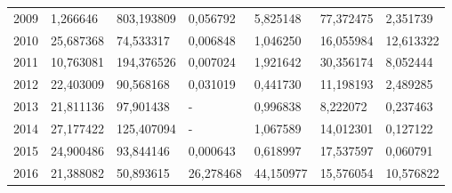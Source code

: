\begin{table}
\begin{tabular}{p{1cm}p{2cm}p{2cm}p{2cm}p{2cm}p{2cm}p{2cm}}
 2009 &                               1,266646 & 803,193809 &     0,056792 &                                           5,825148 &                           77,372475 &                                    2,351739 \\
 2010 &                              25,687368 &  74,533317 &     0,006848 &                                           1,046250 &                           16,055984 &                                   12,613322 \\
 2011 &                              10,763081 & 194,376526 &     0,007024 &                                           1,921642 &                           30,356174 &                                    8,052444 \\
 2012 &                              22,403009 &  90,568168 &     0,031019 &                                           0,441730 &                           11,198193 &                                    2,489285 \\
 2013 &                              21,811136 &  97,901438 &            - &                                           0,996838 &                            8,222072 &                                    0,237463 \\
 2014 &                              27,177422 & 125,407094 &            - &                                           1,067589 &                           14,012301 &                                    0,127122 \\
 2015 &                              24,900486 &  93,844146 &     0,000643 &                                           0,618997 &                           17,537597 &                                    0,060791 \\
 2016 &                              21,388082 &  50,893615 &    26,278468 &                                          44,150977 &                           15,576054 &                                   10,576822 \\
\bottomrule
\end{tabular}
\end{table}

